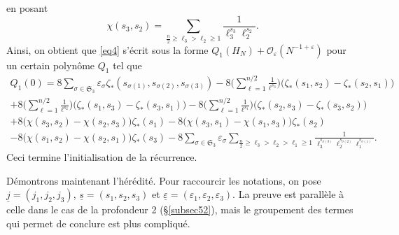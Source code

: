 \documentclass[12pt,francais, reqno]{smfart}
\numberwithin{equation}{section}
\newcommand{\gdo}{\mathcal{O}}
\newcommand{\strois}{\mathfrak{S}_3}
\newcommand{\eps}{\varepsilon}
\newcommand{\gdoeps}{\gdo_\eps (N^{-1+\eps})}
\newcommand{\epssoul}{\underline{\eps}}
\newcommand{\jsoul}{\underline{j}}
\newcommand{\ssoul}{\underline{s}}
\newcommand{\zetaetoile}{\zeta _*}
\begin{document}
en posant
$$\chi(s_3, s_2)  = \sum_{\frac{n}{2} \geq \ell_3 > \ell_2 \geq  1} \frac{1}{\ell_3^{s_3} \ell_2^{s_2}}.$$
Ainsi, on obtient que \eqref{eq4} s'\'ecrit sous la forme $Q_1(H_N) + \gdoeps$ pour un certain polyn\^ome $Q_1$ tel que 
\begin{multline*}
Q_1(0) 
= 8 \sum_{\sigma \in \strois} \eps_\sigma \zetaetoile (s_{\sigma(1)},s_{\sigma(2)}, s_{\sigma(3)}) 
 - 8 \Big( \sum_{\ell = 1} ^{n/2} \frac{1}{\ell^{s_3}} \Big) \Big( \zetaetoile (s_1, s_2) 
 -  \zetaetoile (s_2, s_1) \Big) 
\\
 + 8 \Big( \sum_{\ell = 1} ^{n/2} \frac{1}{\ell^{s_2}} \Big) \Big( \zetaetoile (s_1, s_3)  -  \zetaetoile (s_3, s_1) \Big) 
 - 8 \Big( \sum_{\ell = 1} ^{n/2} \frac{1}{\ell^{s_1}} \Big) \Big( \zetaetoile (s_2, s_3)  -  \zetaetoile (s_3, s_2) \Big) 
\\
+ 8 \Big( \chi(s_3, s_2) - \chi(s_2, s_3)  \Big)  \zetaetoile(s_1)  
 - 8 \Big( \chi(s_3, s_1) - \chi(s_1, s_3)  \Big)  \zetaetoile(s_2)  
\\
- 8 \Big( \chi(s_1, s_2) - \chi(s_2, s_1)  \Big)  \zetaetoile(s_3)  
- 8  \sum_{\sigma \in \strois} \eps_\sigma 
 \sum_{ \frac{n}{2} \geq  \ell_3 >  \ell_2 >  \ell_1 \geq  1} \frac{1}{\ell_3^{s_{\sigma(3)}} \ell_2^{s_{\sigma(2)}}  \ell_1^{s_{\sigma(1)}}}. 
\end{multline*}
 Ceci termine l'initialisation de la r\'ecurrence.
 
 \bigskip 

D\'emontrons maintenant l'h\'er\'edit\'e. Pour raccourcir les notations, on pose $\jsoul = (j_1, j_2, j_3)$, $\ssoul = (s_1, s_2, s_3)$ et $\epssoul = (\eps_1, \eps_2, \eps_3)$. La preuve est parall\`ele \`a celle dans le cas de la profondeur 2 (\S  \ref{subsec52}), mais le groupement des termes qui permet de conclure est plus compliqu\'e. 
\end{document}
